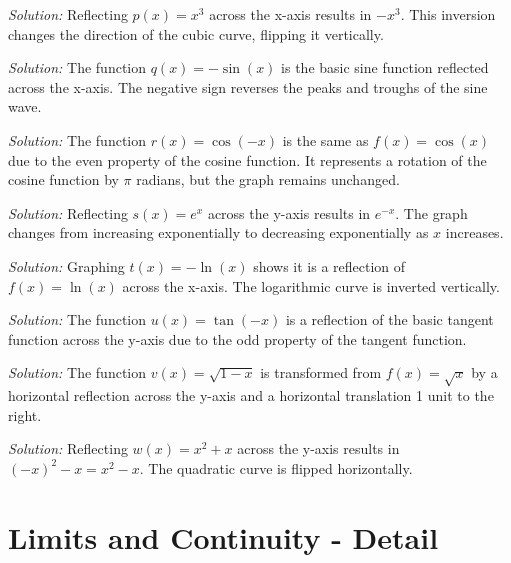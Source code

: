 \documentclass[a4paper,12pt]{book}
\newenvironment{solution}[1][]
{\par\noindent\textit{Solution:} \rmfamily}{\medskip}
\begin{document}
\begin{solution}[3]
Reflecting \( p(x) = x^3 \) across the x-axis results in \( -x^3 \). This inversion changes the direction of the cubic curve, flipping it vertically.
\end{solution}

\begin{solution}[4]
The function \( q(x) = -\sin(x) \) is the basic sine function reflected across the x-axis. The negative sign reverses the peaks and troughs of the sine wave.
\end{solution}

\begin{solution}[5]
The function \( r(x) = \cos(-x) \) is the same as \( f(x) = \cos(x) \) due to the even property of the cosine function. It represents a rotation of the cosine function by \( \pi \) radians, but the graph remains unchanged.
\end{solution}

\begin{solution}[6]
Reflecting \( s(x) = e^x \) across the y-axis results in \( e^{-x} \). The graph changes from increasing exponentially to decreasing exponentially as \( x \) increases.
\end{solution}

\begin{solution}[7]
Graphing \( t(x) = -\ln(x) \) shows it is a reflection of \( f(x) = \ln(x) \) across the x-axis. The logarithmic curve is inverted vertically.
\end{solution}

\begin{solution}[8]
The function \( u(x) = \tan(-x) \) is a reflection of the basic tangent function across the y-axis due to the odd property of the tangent function.
\end{solution}

\begin{solution}[9]
The function \( v(x) = \sqrt{1 - x} \) is transformed from \( f(x) = \sqrt{x} \) by a horizontal reflection across the y-axis and a horizontal translation 1 unit to the right.
\end{solution}

\begin{solution}[10]
Reflecting \( w(x) = x^2 + x \) across the y-axis results in \( (-x)^2 - x = x^2 - x \). The quadratic curve is flipped horizontally.
\end{solution}


\chapter{Limits and Continuity - Detail}
\end{document}
